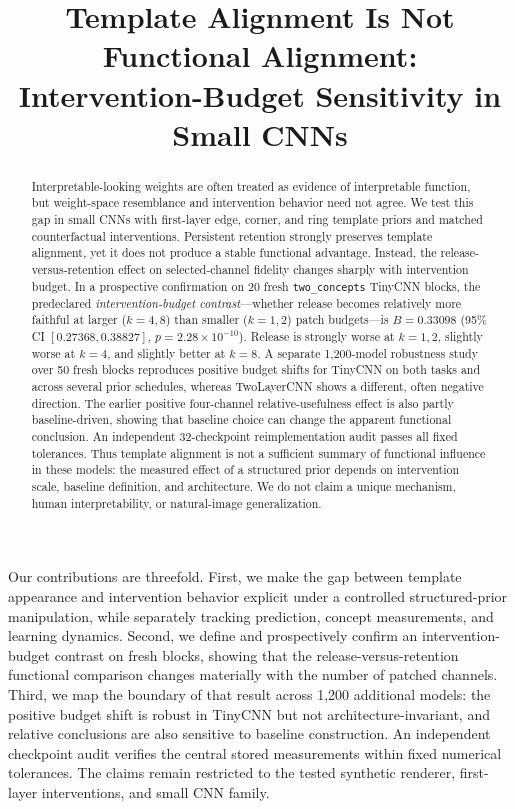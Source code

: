 
\title{Template Alignment Is Not Functional Alignment: Intervention-Budget Sensitivity in Small CNNs}

\begin{abstract}
Interpretable-looking weights are often treated as evidence of interpretable
function, but weight-space resemblance and intervention behavior need not
agree. We test this gap in small CNNs with first-layer edge, corner, and ring
template priors and matched counterfactual interventions. Persistent
retention strongly preserves template alignment, yet it does not produce a
stable functional advantage. Instead, the release-versus-retention effect on
selected-channel fidelity changes sharply with intervention budget. In a
prospective confirmation on 20 fresh \texttt{two\_concepts} TinyCNN blocks,
the predeclared \emph{intervention-budget contrast}---whether release becomes
relatively more faithful at larger ($k=4,8$) than smaller ($k=1,2$) patch
budgets---is $B=0.33098$ (95\% CI $[0.27368,0.38827]$,
$p=2.28\times10^{-10}$). Release is strongly worse at $k=1,2$, slightly
worse at $k=4$, and slightly better at $k=8$. A separate 1,200-model
robustness study over 50 fresh blocks reproduces positive budget shifts for
TinyCNN on both tasks and across several prior schedules, whereas TwoLayerCNN
shows a different, often negative direction. The earlier positive
four-channel relative-usefulness effect is also partly baseline-driven,
showing that baseline choice can change the apparent functional conclusion.
An independent 32-checkpoint reimplementation audit passes all fixed
tolerances. Thus template alignment is not a sufficient summary of functional
influence in these models: the measured effect of a structured prior depends
on intervention scale, baseline definition, and architecture. We do not claim
a unique mechanism, human interpretability, or natural-image generalization.
\end{abstract}

Our contributions are threefold. First, we make the gap between template
appearance and intervention behavior explicit under a controlled
structured-prior manipulation, while separately tracking prediction, concept
measurements, and learning dynamics. Second, we define and prospectively
confirm an intervention-budget contrast on fresh blocks, showing that the
release-versus-retention functional comparison changes materially with the
number of patched channels. Third, we map the boundary of that result across
1,200 additional models: the positive budget shift is robust in TinyCNN but
not architecture-invariant, and relative conclusions are also sensitive to
baseline construction. An independent checkpoint audit verifies the central
stored measurements within fixed numerical tolerances. The claims remain
restricted to the tested synthetic renderer, first-layer interventions, and
small CNN family.
